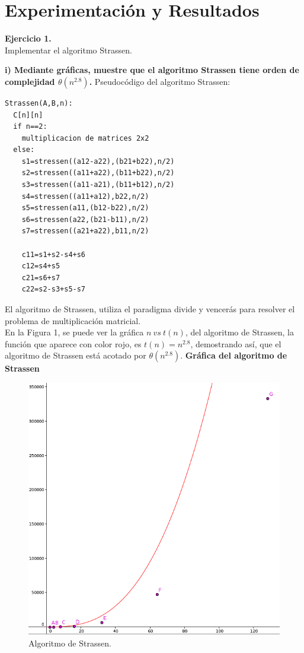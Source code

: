 \documentclass[12pt]{report}
\begin{document}
	\section{Experimentación y Resultados}	
	\textbf{Ejercicio 1.}\\
	Implementar el algoritmo Strassen.\newline
	
	\textbf{i) Mediante gráficas, muestre que el algoritmo Strassen tiene orden de complejidad $\theta (n^{2.8})$.}\newline
	Pseudocódigo del algoritmo Strassen:
	\lstset{language=C, breaklines=true, basicstyle=\footnotesize}
	\lstset{numbers=left, numberstyle=\tiny, stepnumber=1, numbersep=10pt}
	\begin{lstlisting}
Strassen(A,B,n):
  C[n][n]
  if n==2:
    multiplicacion de matrices 2x2
  else:
    s1=stressen((a12-a22),(b21+b22),n/2)
    s2=stressen((a11+a22),(b11+b22),n/2)
    s3=stressen((a11-a21),(b11+b12),n/2)
    s4=stressen((a11+a12),b22,n/2)
    s5=stressen(a11,(b12-b22),n/2)
    s6=stressen(a22,(b21-b11),n/2)
    s7=stressen((a21+a22),b11,n/2)
    
    c11=s1+s2-s4+s6
    c12=s4+s5
    c21=s6+s7
    c22=s2-s3+s5-s7
	\end{lstlisting}
	
	El algoritmo de Strassen, utiliza el paradigma divide y vencerás para resolver el problema de multiplicación matricial.\\
	
	En la Figura 1, se puede ver la gráfica $n \ vs \ t(n)$, del algoritmo de Strassen, la función que aparece con color rojo, es $t(n)=n^{2.8}$, demostrando así, que el algoritmo de Strassen está acotado por $\theta (n^{2.8})$. \newpage
	\textbf{Gráfica del algoritmo de Strassen\\}
	\begin{figure}[H]
		\includegraphics[width=13cm]{imagenes/1.png}
		\centering
		\caption{Algoritmo de Strassen.}
		\centering
	\end{figure}
	\newpage
			
\end{document}
